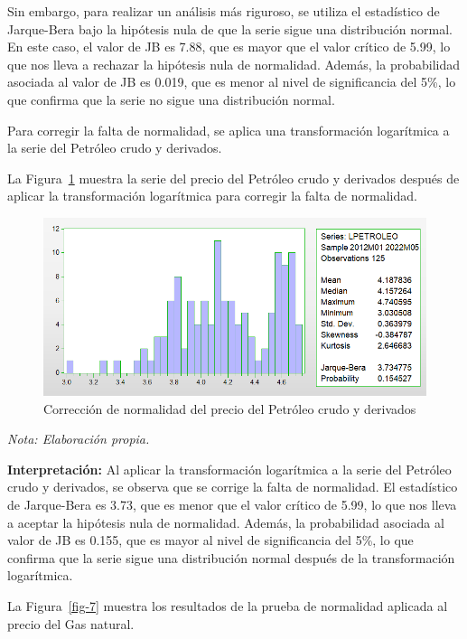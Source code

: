 \documentclass[
  a4paper,
]{article}
\begin{document}
Sin embargo, para realizar un análisis más riguroso, se utiliza el
estadístico de Jarque-Bera bajo la hipótesis nula de que la serie sigue
una distribución normal. En este caso, el valor de JB es 7.88, que es
mayor que el valor crítico de 5.99, lo que nos lleva a rechazar la
hipótesis nula de normalidad. Además, la probabilidad asociada al valor
de JB es 0.019, que es menor al nivel de significancia del 5\%, lo que
confirma que la serie no sigue una distribución normal.

Para corregir la falta de normalidad, se aplica una transformación
logarítmica a la serie del Petróleo crudo y derivados.

La Figura~\ref{fig-6} muestra la serie del precio del Petróleo crudo y
derivados después de aplicar la transformación logarítmica para corregir
la falta de normalidad.

\begin{figure}

\caption{\label{fig-6}Corrección de normalidad del precio del Petróleo
crudo y derivados}

{\centering \includegraphics{20230603090807.png}

}

\end{figure}

\emph{Nota: Elaboración propia.}

\textbf{Interpretación:} Al aplicar la transformación logarítmica a la
serie del Petróleo crudo y derivados, se observa que se corrige la falta
de normalidad. El estadístico de Jarque-Bera es 3.73, que es menor que
el valor crítico de 5.99, lo que nos lleva a aceptar la hipótesis nula
de normalidad. Además, la probabilidad asociada al valor de JB es 0.155,
que es mayor al nivel de significancia del 5\%, lo que confirma que la
serie sigue una distribución normal después de la transformación
logarítmica.

La Figura~\ref{fig-7} muestra los resultados de la prueba de normalidad
aplicada al precio del Gas natural.
\end{document}
